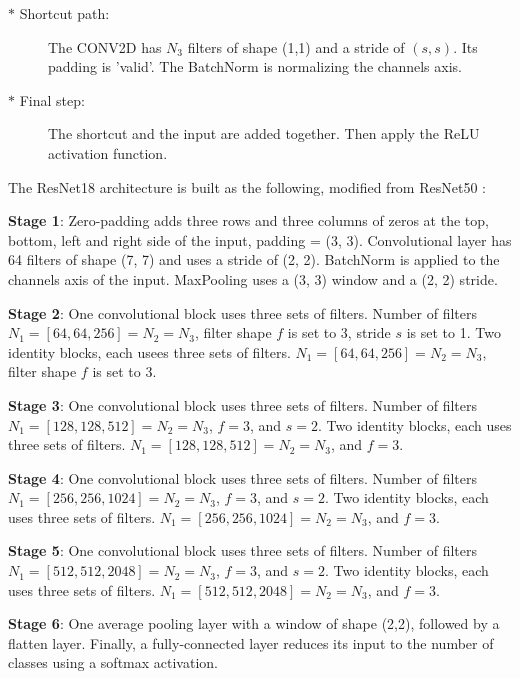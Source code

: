 \begin{enumerate}
\begin{description}
      \item[$\ast$ Shortcut path:] The CONV2D has $N_3$ filters of shape (1,1) and a stride of $(s,s)$. Its padding is 'valid'. The BatchNorm is normalizing the channels axis. 
      \item[$\ast$ Final step:] The shortcut and the input are added together. Then apply the ReLU activation function.
    \end{description}
\end{enumerate}

The ResNet18 architecture is built as the following, modified from ResNet50 \citep{resnet50keras}:

\textbf{Stage 1}:
Zero-padding adds three rows and three columns of zeros at the top, bottom, left and right side of the input, padding = (3, 3).
Convolutional layer has 64 filters of shape (7, 7) and uses a stride of (2, 2).
BatchNorm is applied to the channels axis of the input.
MaxPooling uses a (3, 3) window and a (2, 2) stride.

\textbf{Stage 2}:
One convolutional block uses three sets of filters. Number of filters $N_1 = [64, 64, 256] = N_2 = N_3$, filter shape $f$ is set to 3, stride $s$ is set to 1.
Two identity blocks, each usees three sets of filters. $N_1 = [64, 64, 256] = N_2 = N_3$, filter shape $f$ is set to 3.

\textbf{Stage 3}:
One convolutional block uses three sets of filters. Number of filters $N_1 = [128, 128, 512] = N_2 = N_3$, $f = 3$, and $s = 2$.
Two identity blocks, each uses three sets of filters. $N_1 = [128, 128, 512] = N_2 = N_3$, and $f = 3$.

\textbf{Stage 4}:
One convolutional block uses three sets of filters. Number of filters $N_1 = [256, 256, 1024] = N_2 = N_3$, $f = 3$, and $s = 2$.
Two identity blocks, each uses three sets of filters. $N_1 = [256, 256, 1024] = N_2 = N_3$, and $f = 3$.

\textbf{Stage 5}:
One convolutional block uses three sets of filters. Number of filters $N_1 = [512, 512, 2048] = N_2 = N_3$, $f = 3$, and $s = 2$.
Two identity blocks, each uses three sets of filters. $N_1 = [512, 512, 2048] = N_2 = N_3$, and $f = 3$.

\textbf{Stage 6}:
One average pooling layer with a window of shape (2,2), followed by a flatten layer. Finally, a fully-connected layer reduces its input to the number of classes using a softmax activation.
